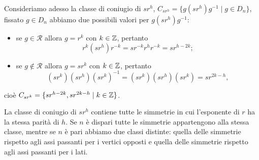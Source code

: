 \documentclass[11pt]{scrartcl}
\begin{document}
Consideriamo adesso la classe di coniugio di $sr^h$, $C_{sr^h} = 
\{g(sr^h)g^{-1}\mid g\in D_n\}$, fissato $g \in D_n$ abbiamo due possibili
valori per $g(sr^h)g^{-1}$:
\begin{itemize}
    \item se $g \in \mathcal{R}$ allora $g = r^k$ con $k \in \mathbb Z$, pertanto
    \[
        r^k(sr^h)r^{-k} = sr^{-k}r^h r^{-k} = sr^{h - 2k};
    \]
    \item se $g \notin \mathcal{R}$ allora $g = sr^k$ con $k \in \mathbb Z$, pertanto
    \[
        (sr^k)(sr^h)(sr^k)^{-1} = (sr^k)(sr^h)(sr^k) = sr^{2k - h},
    \]
\end{itemize}
cioè $C_{sr^k} = \{sr^{h - 2k}, sr^{2k - h}\mid k \in \mathbb Z\}$. 

\begin{remark}
    La classe di coniugio di $sr^h$ contiene tutte le simmetrie in cui 
    l'esponente di $r$ ha la stessa parità di $h$. Se $n$ è 
    dispari tutte le simmetrie appartengono alla stessa classe,
    mentre se $n$ è pari abbiamo due classi distinte: quella 
    delle simmetrie rispetto agli assi passanti per i vertici opposti e quella 
    delle simmetrie rispetto agli assi passanti per i lati.
\end{remark}
\end{document}
